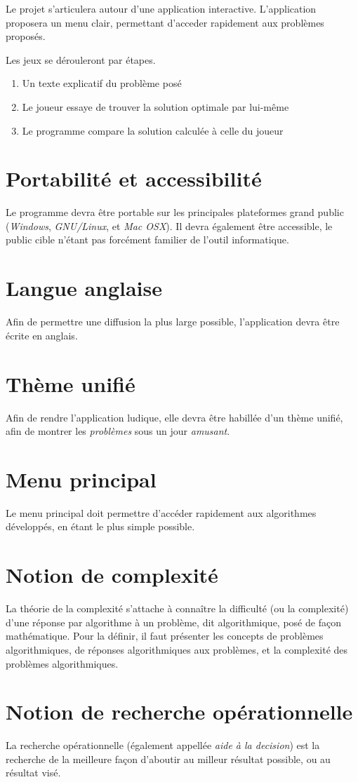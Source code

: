 Le projet s'articulera autour d'une application interactive.
L'application proposera un menu clair, permettant
d'acceder rapidement aux problèmes proposés.

Les jeux se dérouleront par étapes.
\begin{enumerate}
    \item Un texte explicatif du problème posé
    \item Le joueur essaye de trouver la solution optimale par lui-même
    \item Le programme compare la solution calculée à celle du joueur
\end{enumerate}

\section{Portabilité et accessibilité}
    Le programme devra être portable sur les principales plateformes
    grand public (\emph{Windows}, \emph{GNU/Linux}, et \emph{Mac OSX}).
    Il devra également être accessible, le public cible n'étant
    pas forcément familier de l'outil informatique.

\section{Langue anglaise}
    Afin de permettre une diffusion la plus large possible,
    l'application devra être écrite en anglais.

\section{Thème unifié}
    Afin de rendre l'application ludique, elle devra
    être habillée d'un thème unifié,
    afin de montrer les \emph{problèmes} sous un
    jour \emph{amusant}.

\section{Menu principal}
    Le menu principal doit permettre d'accéder rapidement
    aux algorithmes développés, en étant le plus simple possible.

\section{Notion de complexité}
La théorie de la complexité s'attache à connaître la difficulté (ou la
complexité) d'une réponse par algorithme à un problème, dit algorithmique, posé
de façon mathématique. Pour la définir, il faut présenter les concepts de
problèmes algorithmiques, de réponses algorithmiques aux problèmes, et la
complexité des problèmes algorithmiques.~\cite{wp-complex}

\section{Notion de recherche opérationnelle}
La recherche opérationnelle (également appellée \emph{aide à la decision})
est la recherche de la meilleure façon d'aboutir au milleur résultat
possible, ou au résultat visé.
